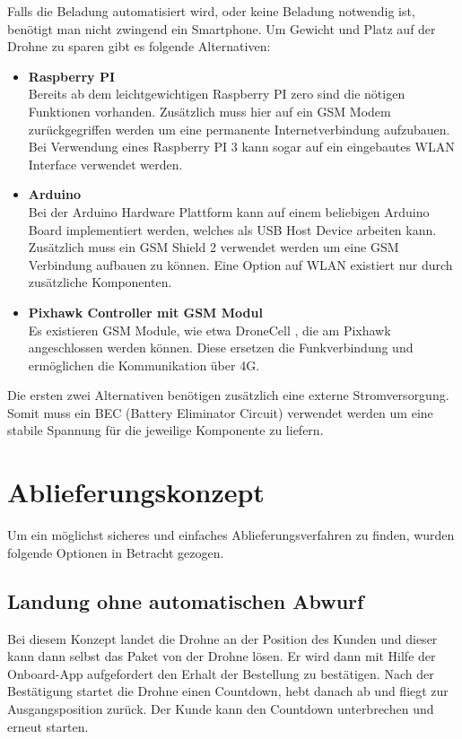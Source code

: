 Falls die Beladung automatisiert wird, oder keine Beladung notwendig ist, benötigt man nicht zwingend ein Smartphone. Um Gewicht und Platz auf der Drohne zu sparen gibt es folgende Alternativen:
\begin{itemize}
	\item{\textbf{Raspberry PI} \\
	Bereits ab dem leichtgewichtigen Raspberry PI zero sind die nötigen Funktionen vorhanden. Zusätzlich muss hier auf ein GSM Modem zurückgegriffen werden um eine permanente Internetverbindung aufzubauen. Bei Verwendung eines Raspberry PI 3 kann sogar auf ein eingebautes WLAN Interface verwendet werden.
	}
	\item{\textbf{Arduino} \\
	Bei der Arduino Hardware Plattform kann auf einem beliebigen Arduino Board implementiert werden, welches als USB Host Device arbeiten kann. Zusätzlich muss ein GSM Shield 2 verwendet werden um eine GSM Verbindung aufbauen zu können. Eine Option auf WLAN existiert nur durch zusätzliche Komponenten.}

	\item{\textbf{Pixhawk Controller mit GSM Modul} \\
	Es existieren GSM Module, wie etwa DroneCell \cite{drone-cell}, die am Pixhawk angeschlossen werden können. Diese ersetzen die Funkverbindung und ermöglichen die Kommunikation über 4G.
	}

\end{itemize}

Die ersten zwei Alternativen benötigen zusätzlich eine externe Stromversorgung. Somit muss ein \Gls{BEC} (Battery Eliminator Circuit) verwendet werden um eine stabile Spannung für die jeweilige Komponente zu liefern. \\


\section{Ablieferungskonzept}
\label{chap:ablieferung}
Um ein möglichst sicheres und einfaches Ablieferungsverfahren zu finden, wurden folgende Optionen in Betracht gezogen.

\subsection{Landung ohne automatischen Abwurf}

Bei diesem Konzept landet die Drohne an der Position des Kunden und dieser kann dann selbst das Paket von der Drohne lösen. Er wird dann mit Hilfe der Onboard-App aufgefordert den Erhalt der Bestellung zu bestätigen. Nach der Bestätigung startet die Drohne einen Countdown, hebt danach ab und fliegt zur Ausgangsposition zurück. Der Kunde kann den Countdown unterbrechen und erneut starten.\\

